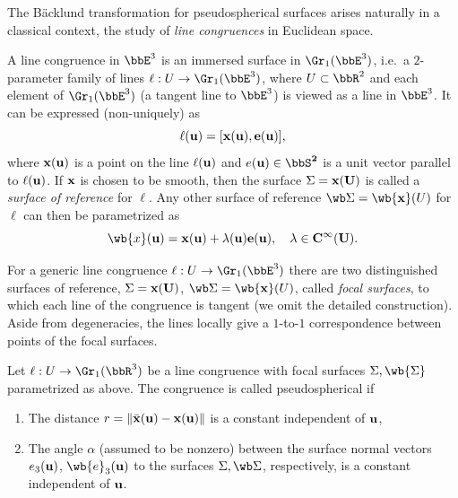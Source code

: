The B\"acklund transformation for pseudospherical surfaces arises naturally in a classical context, the study of \emph{line congruences} in Euclidean space.

\begin{defn}
    A line congruence in $\bbE^3$ is an immersed surface in $\Gr_1(\bbE^3)$, i.e.\ a $2$-parameter family of lines $\ell:U\to \Gr_1(\bbE^3)$, where $U\subset\bbR^2$ and each element of $\Gr_1(\bbE^3)$ (a tangent line to $\bbE^3$) is viewed as a line in $\bbE^3$. It can be expressed (non-uniquely) as 
    \[\ell(\bf{u})=[\bf{x}(\bf{u}),e(\bf{u})],\]
    where $\bf{x}(\bf{u})$ is a point on the line $\ell(\bf{u})$ and $e(\bf{u})\in\bbS^2$ is a unit vector parallel to $\ell(\bf{u})$. If $\bf{x}$ is chosen to be smooth, then the surface $\Sigma=\bf{x}(U)$ is called a \emph{surface of reference} for $\ell$. Any other surface of reference $\wb\Sigma=\wb{\bf{x}}(U)$ for $\ell$ can then be parametrized as 
    \[\wb{x}(\bf{u})=\bf{x}(\bf{u})+\lambda(\bf{u})e(\bf{u}),\quad \lambda\in C^\infty(U).\]

    For a generic line congruence $\ell:U\to \Gr_1(\bbE^3)$ there are two distinguished surfaces of reference, $\Sigma=\bf{x}(U)$, $\wb\Sigma=\wb{\bf{x}}(U)$, called \emph{focal surfaces}, to which each line of the congruence is tangent (we omit the detailed construction). Aside from degeneracies, the lines locally give a $1$-to-$1$ correspondence between points of the focal surfaces.
\end{defn}


\begin{defn}
    Let $\ell:U\to \Gr_1(\bbR^3)$ be a line congruence with focal surfaces $\Sigma,\wb{\Sigma}$ parametrized as above. The congruence is called pseudospherical if 
    \begin{enumerate}[label=(\alph*)]
        \item The distance $r=\lVert\bar{\bf x}(\bf{u})-\bf{x}(\bf{u})\rVert$ is a constant independent of $\bf{u}$,
        \item The angle $\alpha$ (assumed to be nonzero) between the surface normal vectors $e_3(\bf{u})$, $\wb{e}_3(\bf{u})$ to the surfaces $\Sigma,\wb\Sigma$, respectively, is a constant independent of $\bf{u}$.
    \end{enumerate}
\end{defn}

